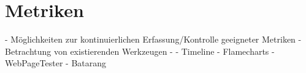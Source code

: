 \section{Metriken}

- Möglichkeiten zur kontinuierlichen Erfassung/Kontrolle geeigneter Metriken
- Betrachtung von existierenden Werkzeugen
  - 
    - Timeline
    - Flamecharts
  - WebPageTester
  - Batarang
